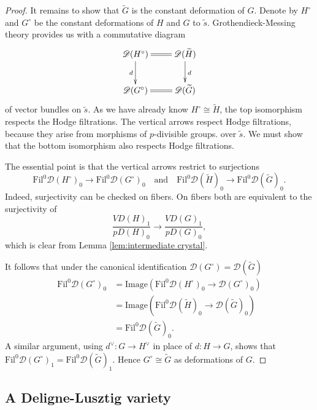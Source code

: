 \documentclass[11pt]{alggeom}
\newcommand{\iso}{\cong}
\begin{document}
\begin{proof}
It remains to show that $\widetilde{G}$ is the constant deformation of $G$.
Denote by $H^\circ$ and $G^\circ$ be the constant deformations of $H$ and $G$ to $\tilde{s}$.
 Grothendieck-Messing theory provides us with  a commutative diagram 
\[
\xymatrix{
{  \mathscr{D}(H^\circ) }  \ar@{=}[r]  \ar[d]_{d}  &   {  \mathscr{D}(\widetilde{H}) } \ar[d]^{d} \\
{  \mathscr{D}(G^\circ) }    \ar@{=}[r]  &   {  \mathscr{D}(\widetilde{G}) }  
}
\]
of vector bundles on $\widetilde{s}$.
As we have already know $H^\circ \iso \widetilde{H}$,  the top isomorphism    respects  the Hodge filtrations.
 The vertical arrows respect Hodge filtrations, because they arise from morphisms of $p$-divisible groups.     
 over $\tilde{s}$.  We must show that the bottom isomorphism also respects Hodge filtrations.
 
 
 The essential point is that the vertical arrows  restrict to  surjections
\[
\mathrm{Fil}^0  \mathscr{D}(H^\circ)_0   \to  \mathrm{Fil}^0 \mathscr{D}(G^\circ)_0 \quad \mbox{and}\quad 
\mathrm{Fil}^0  \mathscr{D}(\widetilde{H})_0  \to  \mathrm{Fil}^0 \mathscr{D}( \widetilde{G})_0.
\]
Indeed, surjectivity can be checked on fibers.  On fibers both are equivalent to the surjectivity of
\[
\frac{ VD(H)_1 }{ pD(H)_0}  \to  \frac{ VD(G)_1 }  {  pD(G)_0 }, 
\]
which is clear from Lemma  \ref{lem:intermediate crystal}.   


It follows that under the canonical identification  $\mathscr{D}(G^\circ) = \mathscr{D}(\widetilde{G})$ 
\begin{align*}
\mathrm{Fil}^0 \mathscr{D}(G^\circ)_0
 & = \mathrm{Image} ( \mathrm{Fil}^0  \mathscr{D}(H^\circ)_0 \to   \mathscr{D}(G^\circ)_0 )   \\
& = 
 \mathrm{Image} ( \mathrm{Fil}^0  \mathscr{D}(\widetilde{H})_0 \to   \mathscr{D}(\widetilde{G})_0 )  \\
 & = 
 \mathrm{Fil}^0 \mathscr{D}( \widetilde{G})_0.
\end{align*}
A similar argument, using   $d^\vee: G\to H^\vee$ in place of $d:H\to G$, shows that
$\mathrm{Fil}^0 \mathscr{D}(G^\circ)_1 = \mathrm{Fil}^0 \mathscr{D}(\widetilde{G})_1$.
Hence $G^\circ \iso \widetilde{G}$ as deformations of $G$.
 \end{proof}










\subsection{A Deligne-Lusztig variety}
\label{ss:DL}
\end{document}
